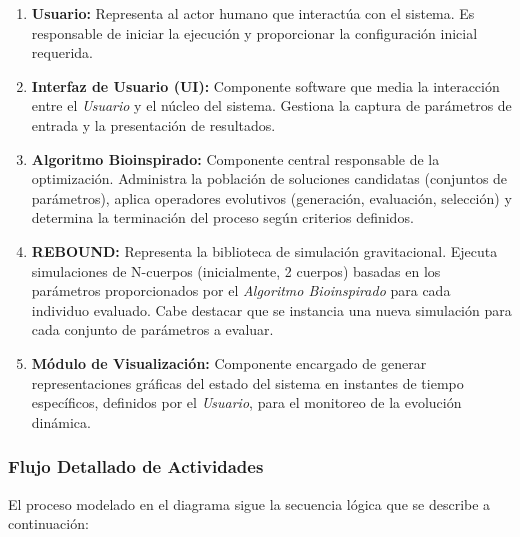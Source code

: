 \begin{enumerate}
    \item \textbf{Usuario:} Representa al actor humano que interactúa con el sistema. Es responsable de iniciar la ejecución y proporcionar la configuración inicial requerida.
    \item \textbf{Interfaz de Usuario (UI):} Componente software que media la interacción entre el \textit{Usuario} y el núcleo del sistema. Gestiona la captura de parámetros de entrada y la presentación de resultados.
    \item \textbf{Algoritmo Bioinspirado:} Componente central responsable de la optimización. Administra la población de soluciones candidatas (conjuntos de parámetros), aplica operadores evolutivos (generación, evaluación, selección) y determina la terminación del proceso según criterios definidos.
    \item \textbf{REBOUND:} Representa la biblioteca de simulación gravitacional. Ejecuta simulaciones de N-cuerpos (inicialmente, 2 cuerpos) basadas en los parámetros proporcionados por el \textit{Algoritmo Bioinspirado} para cada individuo evaluado. Cabe destacar que se instancia una nueva simulación para cada conjunto de parámetros a evaluar.
    \item \textbf{Módulo de Visualización:} Componente encargado de generar representaciones gráficas del estado del sistema en instantes de tiempo específicos, definidos por el \textit{Usuario}, para el monitoreo de la evolución dinámica.
\end{enumerate}

\subsubsection{Flujo Detallado de Actividades}

El proceso modelado en el diagrama sigue la secuencia lógica que se describe a continuación:


